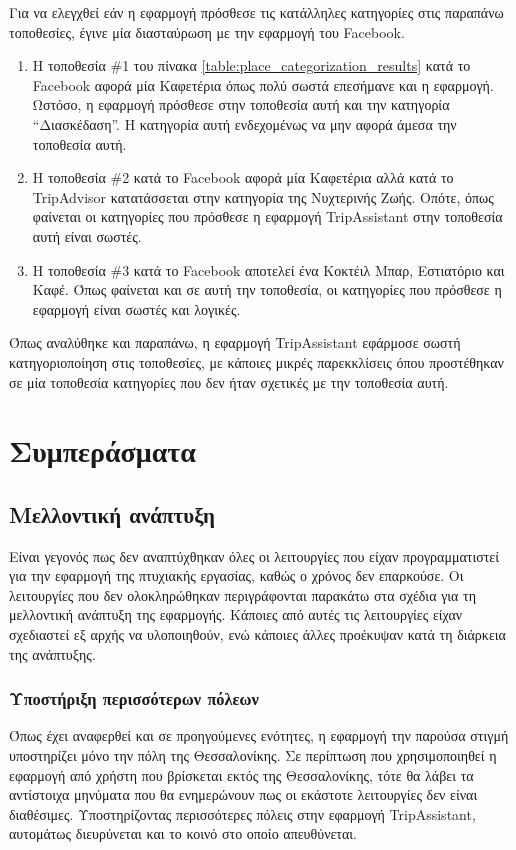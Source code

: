 \documentclass[oneside, 12pt]{book}
\begin{document}
Για να ελεγχθεί εάν η εφαρμογή πρόσθεσε τις κατάλληλες κατηγορίες στις παραπάνω τοποθεσίες, έγινε μία διασταύρωση με την εφαρμογή του Facebook.
\begin{enumerate}
    \item Η τοποθεσία \#1 του πίνακα \ref{table:place_categorization_results} κατά το Facebook αφορά μία Καφετέρια όπως πολύ σωστά επεσήμανε και η εφαρμογή. Ωστόσο, η εφαρμογή πρόσθεσε στην τοποθεσία αυτή και την κατηγορία ``Διασκέδαση''. Η κατηγορία αυτή ενδεχομένως να μην αφορά άμεσα την τοποθεσία αυτή.
    \item Η τοποθεσία \#2 κατά το Facebook αφορά μία Καφετέρια αλλά κατά το TripAdvisor κατατάσσεται στην κατηγορία της Νυχτερινής Ζωής. Οπότε, όπως φαίνεται οι κατηγορίες που πρόσθεσε η εφαρμογή TripAssistant στην τοποθεσία αυτή είναι σωστές.
    \item Η τοποθεσία \#3 κατά το Facebook αποτελεί ένα Κοκτέιλ Μπαρ, Εστιατόριο και Καφέ. Όπως φαίνεται και σε αυτή την τοποθεσία, οι κατηγορίες που πρόσθεσε η εφαρμογή είναι σωστές και λογικές.
\end{enumerate}
Όπως αναλύθηκε και παραπάνω, η εφαρμογή TripAssistant εφάρμοσε σωστή κατηγοριοποίηση στις τοποθεσίες, με κάποιες μικρές παρεκκλίσεις όπου προστέθηκαν σε μία τοποθεσία κατηγορίες που δεν ήταν σχετικές με την τοποθεσία αυτή.

\chapter{Συμπεράσματα}

\section{Μελλοντική ανάπτυξη}
Είναι γεγονός πως δεν αναπτύχθηκαν όλες οι λειτουργίες που είχαν 
προγραμματιστεί για την εφαρμογή της πτυχιακής εργασίας, καθώς ο 
χρόνος δεν επαρκούσε. Οι λειτουργίες που δεν ολοκληρώθηκαν 
περιγράφονται παρακάτω στα σχέδια για τη μελλοντική ανάπτυξη της 
εφαρμογής. Κάποιες από αυτές τις λειτουργίες είχαν σχεδιαστεί εξ 
αρχής να υλοποιηθούν, ενώ κάποιες άλλες προέκυψαν κατά τη διάρκεια 
της ανάπτυξης.

\subsection{Υποστήριξη περισσότερων πόλεων}
Όπως έχει αναφερθεί και σε προηγούμενες ενότητες, η εφαρμογή την 
παρούσα στιγμή υποστηρίζει μόνο την πόλη της Θεσσαλονίκης. 
Σε περίπτωση που χρησιμοποιηθεί η εφαρμογή από χρήστη που βρίσκεται 
εκτός της Θεσσαλονίκης, τότε θα λάβει τα αντίστοιχα μηνύματα που θα 
ενημερώνουν πως οι εκάστοτε λειτουργίες δεν είναι διαθέσιμες.
Υποστηρίζοντας περισσότερες πόλεις στην εφαρμογή TripAssistant, 
αυτομάτως διευρύνεται και το κοινό στο οποίο απευθύνεται.
\end{document}
